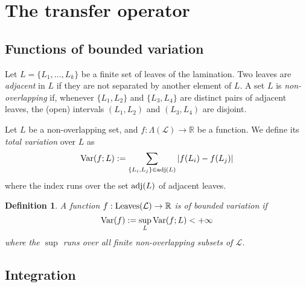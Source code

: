 \documentclass[11pt]{amsart}
\newtheorem{theorem}{Theorem}[section]
\newtheorem{definition}[theorem]{Definition}
\begin{document}



\section{The transfer operator}

\subsection{Functions of bounded variation}

Let $L = \{ L_1,\dots, L_k \}$ be a finite set of leaves of the lamination. 
Two leaves are \emph{adjacent} in $L$ if they are not separated by another element of $L$. 
A set $L$ is \emph{non-overlapping} if, whenever $\{L_1, L_2\}$ and $\{L_3, L_4\}$ are distinct pairs of
adjacent leaves, the (open) intervals $(L_1, L_2)$ and $(L_3, L_4)$ are disjoint. 

Let $L$ be a non-overlapping set, and $f : \Lambda(\mathcal{L}) \to \mathbb{R}$ be a function. We define its \emph{total variation} over $L$ as
$$\textup{Var}(f; L) := \sum_{\{L_i, L_j\} \in \textup{adj}(L)} |f(L_i) - f(L_j)|$$
where the index runs over the set $\textup{adj}(L)$ of adjacent leaves. 

\begin{definition}
A function $f : \textup{Leaves}(\mathcal{L}) \to \mathbb{R}$ is of \emph{bounded variation} if 
$$\textup{Var}(f) := \sup_{L} \textup{Var}(f; L) < + \infty$$
where the $\sup$ runs over all finite non-overlapping subsets of $\mathcal{L}$. 
\end{definition}

\subsection{Integration}
\end{document}
